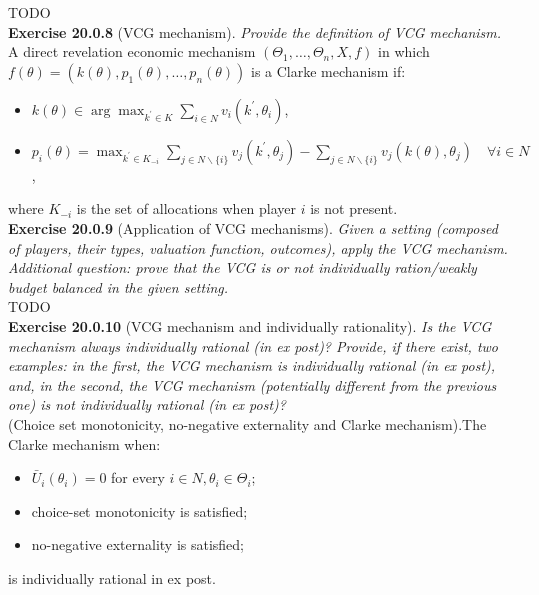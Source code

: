 TODO\\

\textbf{Exercise 20.0.8} (VCG mechanism). \textit{Provide the definition of VCG mechanism.}\\

A direct revelation economic mechanism $\left(\Theta_{1}, \ldots, \Theta_{n}, X, f\right)$ in which $f(\theta)=\left(k(\theta), p_{1}(\theta), \ldots, p_{n}(\theta)\right)$ is a Clarke mechanism if:
\begin{itemize}
\item $k(\theta) \in \arg \max _{k^{\prime} \in K} \sum_{i \in N} v_{i}\left(k^{\prime}, \theta_{i}\right)$,
\item $p_{i}(\theta)=\max _{k^{\prime} \in K_{-i}} \sum_{j \in N \backslash\{i\}} v_{j}\left(k^{\prime}, \theta_{j}\right)-\sum_{j \in N \backslash\{i\}} v_{j}\left(k(\theta), \theta_{j}\right) \quad \forall i \in N$,
\end{itemize}
where $K_{-i}$ is the set of allocations when player $i$ is not present.\\

\textbf{Exercise 20.0.9} (Application of VCG mechanisms). \textit{Given a setting (composed of players, their types, valuation function, outcomes), apply the VCG mechanism. Additional question: prove that the VCG is or not individually ration/weakly budget balanced in the given setting.}\\

TODO\\

\textbf{Exercise 20.0.10} (VCG mechanism and individually rationality). \textit{Is the VCG mechanism always individually rational (in ex post)? Provide, if there exist, two examples: in the first, the VCG mechanism is individually rational (in ex post), and, in the second, the VCG mechanism (potentially different from the previous one) is not individually rational (in ex post)?}\\

(Choice set monotonicity, no-negative externality and Clarke mechanism).The Clarke mechanism when:
\begin{itemize}
\item $\bar{U}_i (\theta_i) = 0$ for every $i \in N, \theta_i \in \Theta_i$;
\item choice-set monotonicity is satisfied;
\item no-negative externality is satisfied;
\end{itemize}
is individually rational in ex post.\\

